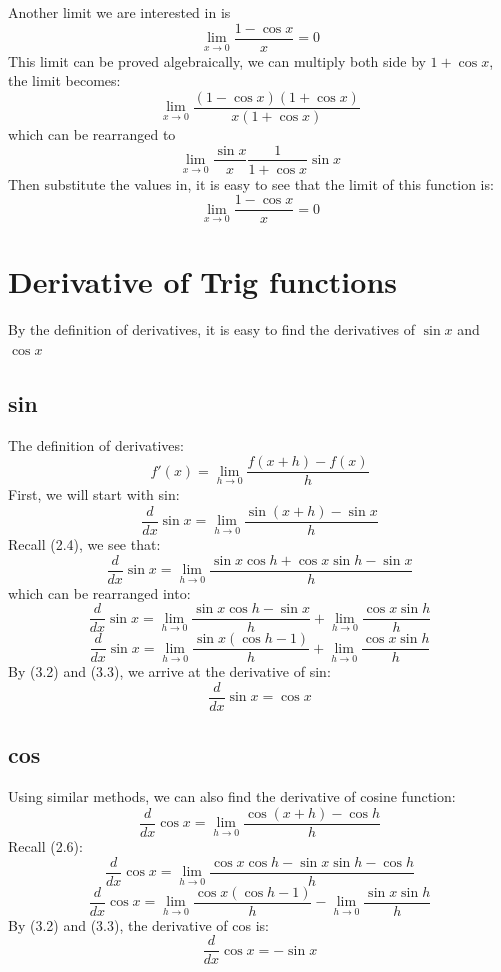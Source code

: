 \documentclass{article}
\begin{document}
\newpage
Another limit we are interested in is 
\[
    \lim_{x\to 0}\frac{1-\cos x}{x} = 0
\]
This limit can be proved algebraically, we can multiply both side by $1+\cos x$, the limit becomes:
\[
    \lim_{x\to 0}\frac{(1-\cos x)(1+\cos x)}{x(1+\cos x)}
\]
which can be rearranged to
\[
    \lim_{x\to 0}\frac{\sin x}{x}\frac{1}{1+\cos x}\sin x
\]
Then substitute the values in, it is easy to see that the limit of this function is:
\begin{equation}
    \lim_{x\to 0}\frac{1-\cos x}{x} = 0
\end{equation}

\section{Derivative of Trig functions}
By the definition of derivatives, it is easy to find the derivatives of $\sin x$ and $\cos x$
\subsection{sin}
The definition of derivatives:
\begin{equation}
    f'(x) = \lim_{h\to 0}\frac{f(x+h)-f(x)}{h}
\end{equation}
First, we will start with sin:
\[
    \frac{d}{dx}\sin x = \lim_{h\to 0 }\frac{\sin(x+h)-\sin x}{h}
\]
Recall (2.4), we see that:
\[
    \frac{d}{dx}\sin x = \lim_{h\to 0}\frac{\sin x \cos h + \cos x \sin h - \sin x}{h}
\]
which can be rearranged into:
\[
    \frac{d}{dx}\sin x = \lim_{h\to 0}\frac{\sin x \cos h -\sin x}{h} + \lim_{h\to 0} \frac{\cos x \sin h}{h}
\]
\[
    \frac{d}{dx}\sin x = \lim_{h\to 0}\frac{\sin x (\cos h - 1)}{h} + \lim_{h\to 0} \frac{\cos x \sin h}{h}
\]
By (3.2) and (3.3), we arrive at the derivative of sin:
\begin{equation}
    \frac{d}{dx}\sin x = \cos x
\end{equation}

\subsection{cos}
Using similar methods, we can also find the derivative of cosine function:
\[
    \frac{d}{dx}\cos x = \lim_{h\to 0}\frac{\cos(x+h) - \cos h}{h}
\]
Recall (2.6):
\[
    \frac{d}{dx}\cos x = \lim_{h\to 0}\frac{\cos x\cos h - \sin x \sin h - \cos h}{h}
\]
\[
    \frac{d}{dx}\cos x = \lim_{h\to 0}\frac{\cos x (\cos h -1)}{h} - \lim_{h\to 0}\frac{\sin x \sin h}{h}
\]
By (3.2) and (3.3), the derivative of cos is:
\begin{equation}
    \frac{d}{dx}\cos x = -\sin x
\end{equation}
\end{document}
